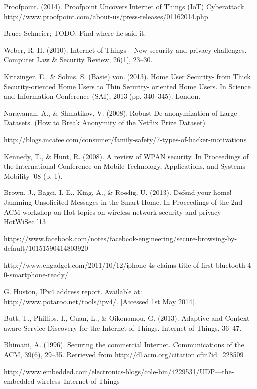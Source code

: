 \documentclass[10pt,journal,compsoc]{IEEEtran}
\begin{document}
\begin{thebibliography}{1}
Proofpoint. (2014). Proofpoint Uncovers Internet of Things (IoT) Cyberattack. http://www.proofpoint.com/about-us/press-releases/01162014.php

Bruce Schneier; TODO: Find where he said it.

Weber, R. H. (2010). Internet of Things – New security and privacy challenges. Computer Law \& Security Review, 26(1), 23–30. 

Kritzinger, E., \& Solms, S. (Basie) von. (2013). Home User Security- from Thick Security-oriented Home Users to Thin Security- oriented Home Users. In Science and Information Conference (SAI), 2013 (pp. 340–345). London.

Narayanan, A., \& Shmatikov, V. (2008). Robust De-anonymization of Large Datasets. (How to Break Anonymity of the Netflix Prize Dataset)

http://blogs.mcafee.com/consumer/family-safety/7-types-of-hacker-motivations

Kennedy, T., \& Hunt, R. (2008). A review of WPAN security. In Proceedings of the International Conference on Mobile Technology, Applications, and Systems - Mobility ’08 (p. 1).

Brown, J., Bagci, I. E., King, A., \& Roedig, U. (2013). Defend your home! Jamming Unsolicited Messages in the Smart Home. In Proceedings of the 2nd ACM workshop on Hot topics on wireless network security and privacy - HotWiSec ’13 

https://www.facebook.com/notes/facebook-engineering/secure-browsing-by-default/10151590414803920

http://www.engadget.com/2011/10/12/iphone-4s-claims-title-of-first-bluetooth-4-0-smartphone-ready/

G. Huston, IPv4 address report.􏰄Available at: http://www.potaroo.net/tools/ipv4/. [Accessed 1st May 2014].

Butt, T., Phillips, I., Guan, L., \& Oikonomou, G. (2013). Adaptive and Context-aware Service Discovery for the Internet of Things. Internet of Things, 36–47. 

Bhimani, A. (1996). Securing the commercial Internet. Communications of the ACM, 39(6), 29–35. Retrieved from http://dl.acm.org/citation.cfm?id=228509

http://www.embedded.com/electronics-blogs/cole-bin/4229531/UDP---the-embedded-wireless--Internet-of-Things-


\end{thebibliography}
\end{document}
